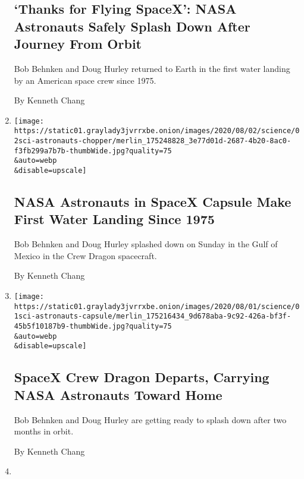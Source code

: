 \begin{enumerate}
{  \subsection{`Thanks for Flying SpaceX': NASA Astronauts Safely Splash
  Down After Journey From
  Orbit}\label{thanks-for-flying-spacex-nasa-astronauts-safely-splash-down-after-journey-from-orbit}}

  Bob Behnken and Doug Hurley returned to Earth in the first water
  landing by an American space crew since 1975.

  By Kenneth Chang
\item
  \href{/2020/08/02/science/spacex-nasa-return.html}{}

  \texttt{[image: https://static01.graylady3jvrrxbe.onion/images/2020/08/02/science/02sci-astronauts-chopper/merlin\_175248828\_3e77d01d-2687-4b20-8ac0-f3fb299a7b7b-thumbWide.jpg?quality=75\\\&auto=webp\\\&disable=upscale]}

  \hypertarget{nasa-astronauts-in-spacex-capsule-make-first-water-landing-since-1975}{%
  \subsection{NASA Astronauts in SpaceX Capsule Make First Water Landing
  Since
  1975}\label{nasa-astronauts-in-spacex-capsule-make-first-water-landing-since-1975}}

  Bob Behnken and Doug Hurley splashed down on Sunday in the Gulf of
  Mexico in the Crew Dragon spacecraft.

  By Kenneth Chang
\item
  \href{/2020/08/01/science/nasa-spacex-astronauts.html}{}

  \texttt{[image: https://static01.graylady3jvrrxbe.onion/images/2020/08/01/science/01sci-astronauts-capsule/merlin\_175216434\_9d678aba-9c92-426a-bf3f-45b5f10187b9-thumbWide.jpg?quality=75\\\&auto=webp\\\&disable=upscale]}

  \hypertarget{spacex-crew-dragon-departs-carrying-nasa-astronauts-toward-home}{%
  \subsection{SpaceX Crew Dragon Departs, Carrying NASA Astronauts
  Toward
  Home}\label{spacex-crew-dragon-departs-carrying-nasa-astronauts-toward-home}}

  Bob Behnken and Doug Hurley are getting ready to splash down after two
  months in orbit.

  By Kenneth Chang
\item
  \href{/2020/07/30/science/nasa-mars-launch.html}{}


\end{enumerate}

